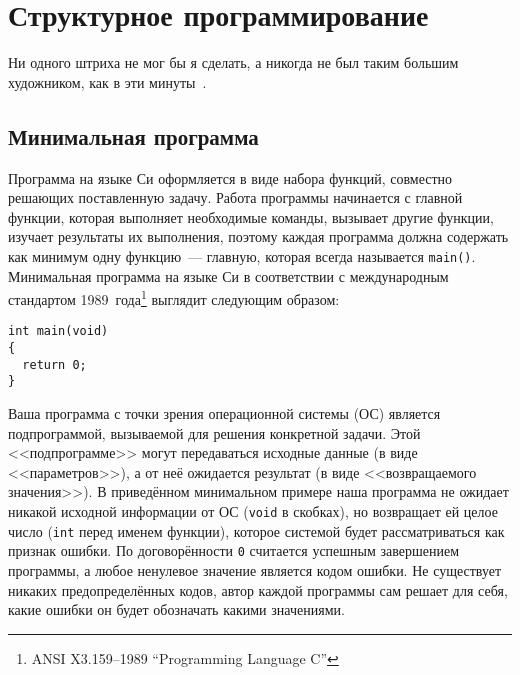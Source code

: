 \chapter{Структурное программирование}


Ни одного штриха не мог бы я сделать, а никогда не был таким большим
художником, как в эти минуты~\cite{podbelsky2015kurs}.


\section{Минимальная программа}


Программа на языке Си оформляется в виде набора функций, совместно решающих
поставленную задачу. Работа программы начинается с главной функции, которая
выполняет необходимые команды, вызывает другие функции, изучает результаты их
выполнения, поэтому каждая программа должна содержать как минимум одну
функцию~--- главную, которая всегда называется \texttt{main()}. Минимальная
программа на языке Си в соответствии с международным стандартом
1989~года\footnote{ANSI X3.159--1989 ``Programming Language C''} выглядит
следующим образом:

\begin{verbatim}
int main(void)
{
  return 0;
}
\end{verbatim}

Ваша программа с точки зрения операционной системы (ОС) является
подпрограммой, вызываемой для решения конкретной задачи. Этой <<подпрограмме>>
могут передаваться исходные данные (в виде <<параметров>>), а от неё ожидается
результат (в виде <<возвращаемого значения>>). В приведённом минимальном
примере наша программа не ожидает никакой исходной информации от ОС
(\texttt{void} в скобках), но возвращает ей целое число (\texttt{int} перед
именем функции), которое системой будет рассматриваться как признак ошибки. По
договорённости \texttt{0} считается успешным завершением программы, а любое
ненулевое значение является кодом ошибки. Не существует никаких
предопределённых кодов, автор каждой программы сам решает для себя, какие
ошибки он будет обозначать какими значениями.


